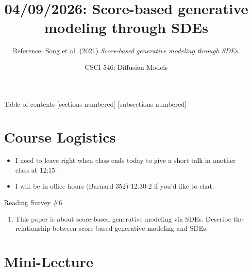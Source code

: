 \documentclass[10pt]{beamer}
\title{04/09/2026: Score-based generative modeling through SDEs}
\author{Reference: Song et al. (2021) \textit{Score-based generative modeling through SDEs.}}
\date{CSCI 546: Diffusion Models}
\begin{document}
\maketitle


\begin{frame}{Table of contents}
  [sections numbered]
  [subsections numbered]
  \tableofcontents
\end{frame}





\section{Course Logistics}



\begin{frame}

\begin{myredbox}[title=Announcements]
\begin{itemize}
	\item I need to leave right when class ends today to give a short talk in another class at 12:15.
	\item I will be in office hours (Barnard 352) 12:30-2 if you'd like to chat.
\end{itemize}
	
\end{myredbox}

	
\end{frame}


\begin{frame}{Reading Survey \#6}

\begin{enumerate}
	\item This paper is about score-based generative modeling via SDEs.  Describe the relationship between score-based generative modeling and SDEs.
\end{enumerate}
	
\end{frame}




\section{Mini-Lecture}
\end{document}

